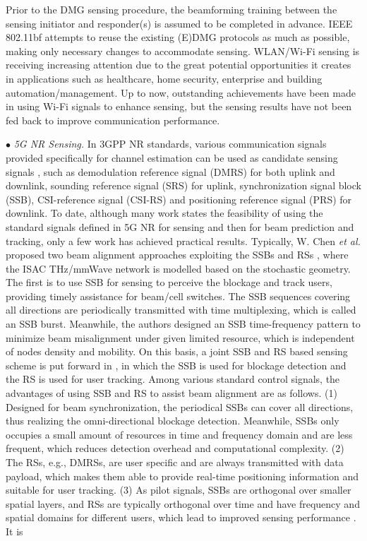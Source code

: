 \documentclass[journal,comsoc]{IEEEtran}
\begin{document}
Prior to the DMG sensing procedure, the beamforming training between the sensing initiator and responder(s) is assumed to be completed in advance. IEEE 802.11bf attempts to reuse the existing (E)DMG protocols as much as possible, making only necessary changes to accommodate sensing. WLAN/Wi-Fi sensing is receiving increasing attention due to the great potential opportunities it creates in applications such as healthcare, home security, enterprise and building automation/management. Up to now, outstanding achievements have been made in using Wi-Fi signals to enhance sensing, but the sensing results have not been fed back to improve communication performance.




$\bullet$ \emph{5G NR Sensing.} In 3GPP NR standards, various communication signals provided specifically for channel estimation can be used as candidate sensing signals \cite{Integrated-Sensing-Communications-2022,Perceptive-Mobile-Networks-2021,5G-PRS-Based-Sensing-2022}, such as demodulation reference signal (DMRS) for both uplink and downlink, sounding reference signal (SRS) for uplink, synchronization signal block (SSB), CSI-reference signal (CSI-RS) and positioning reference signal (PRS) for downlink. To date, although many work states the feasibility of using the standard signals defined in 5G NR for sensing and then for beam prediction and tracking, only a few work has achieved practical results. Typically, W. Chen \emph{et al.} proposed two beam alignment approaches exploiting the SSBs and RSs \cite{Enhancing-THz-mmWave-Beam-Alignment-2022,An-ISAC-based-Beam-Alignment-2022}, where the ISAC THz/mmWave network is modelled based on the stochastic geometry. The first \cite{Enhancing-THz-mmWave-Beam-Alignment-2022} is to use SSB for sensing to perceive the blockage and track users, providing timely assistance for beam/cell switches. The SSB sequences covering all directions are periodically transmitted with time multiplexing, which is called an SSB burst. Meanwhile, the authors designed an SSB time-frequency pattern to minimize beam misalignment under given limited resource, which is independent of nodes density and mobility. On this basis, a joint SSB and RS based sensing scheme is put forward in \cite{An-ISAC-based-Beam-Alignment-2022}, in which the SSB is used for blockage detection and the RS is used for user tracking. Among various standard control signals, the advantages of using SSB and RS to assist beam alignment are as follows. (1) Designed for beam synchronization, the periodical SSBs can cover all directions, thus realizing the omni-directional blockage detection. Meanwhile, SSBs only occupies a small amount of resources in time and frequency domain and are less frequent, which reduces detection overhead and computational complexity. (2) The RSs, e.g., DMRSs, are user specific and are always transmitted with data payload, which makes them able to provide real-time positioning information and suitable for user tracking. (3) As pilot signals, SSBs are orthogonal over smaller spatial layers, and RSs are typically orthogonal over time and have frequency and spatial domains for different users, which lead to improved sensing performance \cite{Perceptive-Mobile-Networks-2021}. It is 
\end{document}
